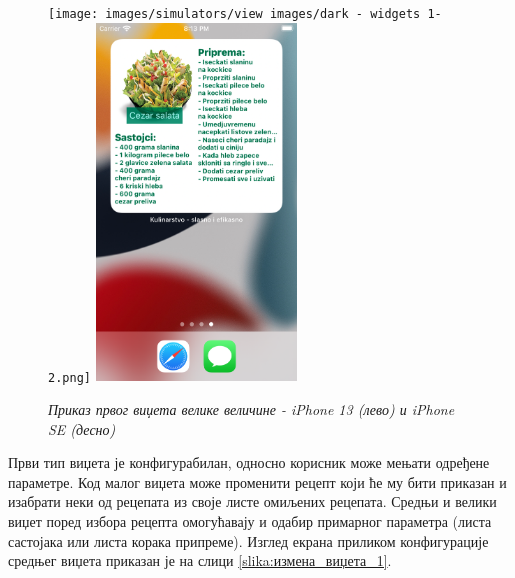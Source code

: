 \documentclass[12pt,oneside]{memoir}
\begin{document}
\begin{figure} [H]
    \centering
    \captionsetup{justification=centering}
    \texttt{[image: images/simulators/view images/dark - widgets 1-2.png]} 
    \hfill
    \includegraphics[width=0.475\textwidth]{images/simulators/view images/light - widgets 1-2.png} 
    \caption{\textit{Приказ првог виџета велике величине - iPhone 13 (лево) и iPhone SE (десно)}}
    \label{slika:приказ_виџета_2_1}
\end{figure}

\indent Први тип виџета је конфигурабилан, односно корисник може мењати одређене параметре. Код малог виџета може променити рецепт који ће му бити приказан и изабрати неки од рецепата из своје листе омиљених рецепата. Средњи и велики виџет поред избора рецепта омогућавају и одабир примарног параметра (листа састојака или листа корака припреме). Изглед екрана приликом конфигурације средњег виџета приказан је на слици  \ref{slika:измена_виџета_1}.
\end{document}
